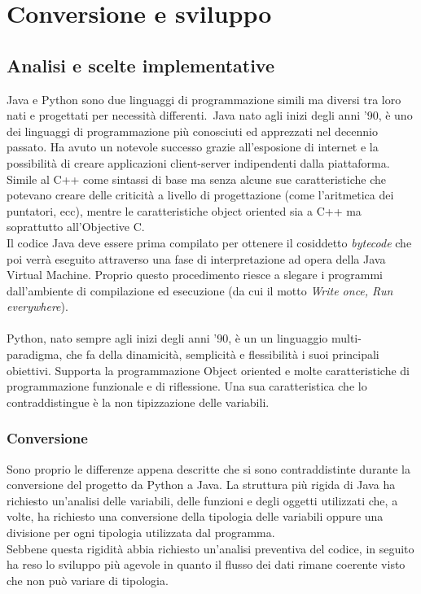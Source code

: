 \chapter{Conversione e sviluppo}

\section{Analisi e scelte implementative}
Java e Python sono due linguaggi di programmazione simili ma diversi tra loro nati e progettati per necessit\`a differenti.\
Java nato agli inizi degli anni '90, \`e uno dei linguaggi di programmazione pi\`u conosciuti ed apprezzati
nel decennio passato. Ha avuto un notevole successo grazie all'esposione di internet e la possibilit\`a
di creare applicazioni client-server indipendenti dalla piattaforma. Simile al C++ come sintassi di base
ma senza alcune sue caratteristiche che potevano creare delle criticit\`a a livello di progettazione
(come l'aritmetica dei puntatori, ecc)\cite{new_2}, mentre le caratteristiche object oriented sia
a C++ ma soprattutto all'Objective C.\\
Il codice Java deve essere prima compilato per ottenere il cosiddetto \textit{bytecode} che poi verr\`a
eseguito attraverso una fase di interpretazione ad opera della Java Virtual Machine. Proprio questo procedimento
riesce a slegare i programmi dall'ambiente di compilazione ed esecuzione (da cui il motto \textit{Write once, Run everywhere}). \\
\\
Python, nato sempre agli inizi degli anni '90, \`e un un linguaggio multi-paradigma, che fa della dinamicit\`a,
semplicit\`a e flessibilit\`a i suoi principali obiettivi. Supporta la programmazione Object oriented e molte
caratteristiche di programmazione funzionale e di riflessione. Una sua caratteristica che lo contraddistingue \`e la
non tipizzazione delle variabili.

\subsection{Conversione}
Sono proprio le differenze appena descritte che si sono contraddistinte durante la conversione del progetto da Python a Java.
La struttura pi\`u rigida di Java ha richiesto un'analisi delle variabili, delle funzioni e degli oggetti utilizzati che,
a volte, ha richiesto una conversione della tipologia delle variabili oppure una divisione per ogni tipologia utilizzata dal programma.\\
Sebbene questa rigidit\`a abbia richiesto un'analisi preventiva del codice, in seguito ha reso lo sviluppo pi\`u agevole in quanto
il flusso dei dati rimane coerente visto che non pu\`o variare di tipologia.

